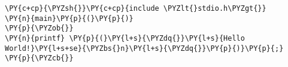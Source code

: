 \begin{Verbatim}[commandchars=\\\{\}]
\PY{c+cp}{\PYZsh{}}\PY{c+cp}{include \PYZlt{}stdio.h\PYZgt{}}
\PY{n}{main}\PY{p}{(}\PY{p}{)}
\PY{p}{\PYZob{}}
\PY{n}{printf} \PY{p}{(}\PY{l+s}{\PYZdq{}}\PY{l+s}{Hello World!}\PY{l+s+se}{\PYZbs{}n}\PY{l+s}{\PYZdq{}}\PY{p}{)}\PY{p}{;}
\PY{p}{\PYZcb{}}
\end{Verbatim}

